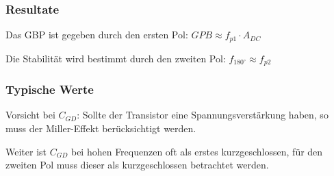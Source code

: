 \subsubsection{Resultate}
Das GBP ist gegeben durch den ersten Pol: 
$GPB \approx f_{p1} \cdot A_{DC}$

Die Stabilität wird bestimmt durch den zweiten Pol:
$f_{180^\circ} \approx f_{p2}$

\subsubsection{Typische Werte}
Vorsicht bei $C_{GD}$: Sollte der Transistor eine Spannungsverstärkung haben, so muss der Miller-Effekt berücksichtigt werden.

Weiter ist $C_{GD}$ bei hohen Frequenzen oft als erstes kurzgeschlossen, für den zweiten Pol muss dieser als kurzgeschlossen betrachtet werden.


